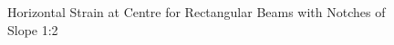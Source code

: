 \documentclass[11pt,a4paper]{article}
\numberwithin{equation}{subsection}
\begin{document}
\begin{figure}[h]
	\begin{center}
	\end{center}
	\caption{Horizontal Strain at Centre for Rectangular Beams with Notches of Slope 1:2}
	\label{fig:Rect_12_Z}
\end{figure}
\end{document}
